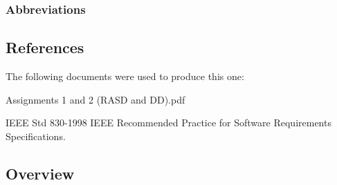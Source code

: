 \subsubsection{Abbreviations}


\subsection{References}
The following documents were used to produce this one:
\begingroup
\renewcommand{\section}[2]{}%
\begin{thebibliography}{9}
Assignments 1 and 2 (RASD and DD).pdf

IEEE Std 830-1998 IEEE Recommended Practice for Software Requirements
Specifications.
\end{thebibliography}
\endgroup

\subsection{Overview}

